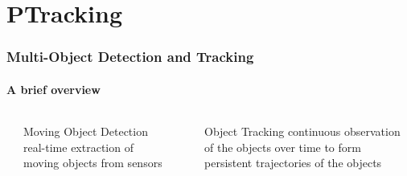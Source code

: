 \section{PTracking}

\begin{frame}
	\frametitle{Multi-Object Detection and Tracking}
	\framesubtitle{A brief overview}
	
	\begin{columns}[t]
		\centering
		
		{
			\vspace{0.2cm}
		}
		
		{
			\begin{block}{Moving Object Detection}
				real-time extraction of moving objects from sensors
			\end{block}
		}
		
		{
			\vspace{2.84cm}
		}
		
		\vspace{1.0cm}
		
		{
			\begin{block}{Object Tracking\cite{Yilmaz06}}
				continuous observation of the objects over time to form persistent
				trajectories of the objects
			\end{block}
		}
		
		\centering
		
		{
		}
		

\end{columns}
\end{frame}

